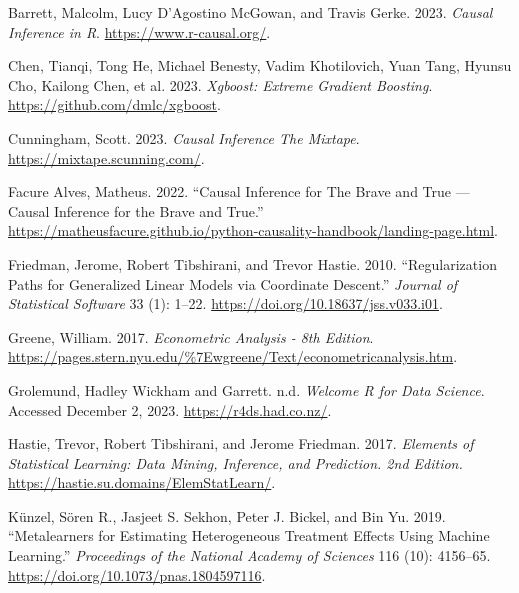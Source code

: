 \documentclass[
  letterpaper,
]{krantz}
\newlength{\cslhangindent}
\newlength{\cslentryspacingunit} %
\newenvironment{CSLReferences}[2] %
 {%
  \setlength{\parindent}{0pt}
  \ifodd #1
  \let\oldpar\par
  \def\par{\hangindent=\cslhangindent\oldpar}
  \fi
  \setlength{\parskip}{#2\cslentryspacingunit}
 }%
 {}
\begin{document}
\hypertarget{refs}{}
\begin{CSLReferences}{1}{0}
\leavevmode{}%
Barrett, Malcolm, Lucy D'Agostino McGowan, and Travis Gerke. 2023.
\emph{Causal {Inference} in {R}}. \url{https://www.r-causal.org/}.

\leavevmode{}%
Chen, Tianqi, Tong He, Michael Benesty, Vadim Khotilovich, Yuan Tang,
Hyunsu Cho, Kailong Chen, et al. 2023. \emph{Xgboost: Extreme Gradient
Boosting}. \url{https://github.com/dmlc/xgboost}.

\leavevmode{}%
Cunningham, Scott. 2023. \emph{Causal {Inference} {The} {Mixtape}}.
\url{https://mixtape.scunning.com/}.

\leavevmode{}%
Facure Alves, Matheus. 2022. {``Causal {Inference} for {The} {Brave} and
{True} --- {Causal} {Inference} for the {Brave} and {True}.''}
\url{https://matheusfacure.github.io/python-causality-handbook/landing-page.html}.

\leavevmode{}%
Friedman, Jerome, Robert Tibshirani, and Trevor Hastie. 2010.
{``Regularization Paths for Generalized Linear Models via Coordinate
Descent.''} \emph{Journal of Statistical Software} 33 (1): 1--22.
\url{https://doi.org/10.18637/jss.v033.i01}.

\leavevmode{}%
Greene, William. 2017. \emph{Econometric {Analysis} - 8th {Edition}}.
\url{https://pages.stern.nyu.edu/%7Ewgreene/Text/econometricanalysis.htm}.

\leavevmode{}%
Grolemund, Hadley Wickham and Garrett. n.d. \emph{Welcome {\textbar} {R}
for {Data} {Science}}. Accessed December 2, 2023.
\url{https://r4ds.had.co.nz/}.

\leavevmode{}%
Hastie, Trevor, Robert Tibshirani, and Jerome Friedman. 2017.
\emph{Elements of {Statistical} {Learning}: Data Mining, Inference, and
Prediction. 2nd {Edition}.}
\url{https://hastie.su.domains/ElemStatLearn/}.

\leavevmode{}%
Künzel, Sören R., Jasjeet S. Sekhon, Peter J. Bickel, and Bin Yu. 2019.
{``Metalearners for Estimating Heterogeneous Treatment Effects Using
Machine Learning.''} \emph{Proceedings of the National Academy of
Sciences} 116 (10): 4156--65.
\url{https://doi.org/10.1073/pnas.1804597116}.


\end{CSLReferences}
\end{document}
